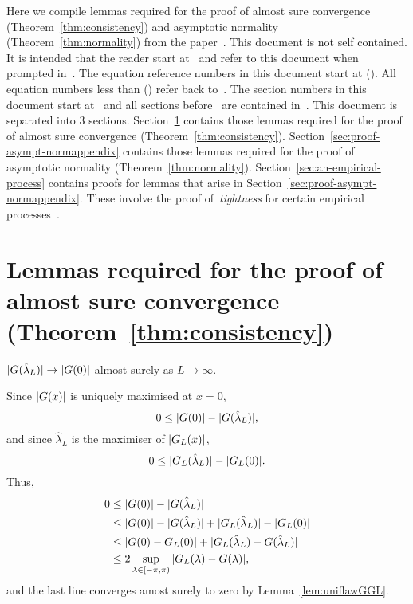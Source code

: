 \documentclass[journal]{IEEEtran}
\begin{document}
Here we compile lemmas required for the proof of almost sure convergence (Theorem~\ref{thm:consistency}) and asymptotic normality (Theorem~\ref{thm:normality}) from the paper~\cite{McKilliam_leastsqPSKpilotsdata_2012}.  This document is not self contained.  It is intended that the reader start at~\cite{McKilliam_leastsqPSKpilotsdata_2012} and refer to this document when prompted in~\cite{McKilliam_leastsqPSKpilotsdata_2012}.  The equation reference numbers in this document start at ().  All equation numbers less than () refer back to~\cite{McKilliam_leastsqPSKpilotsdata_2012}.  The section numbers in this document start at~ and all sections before~ are contained in~\cite{McKilliam_leastsqPSKpilotsdata_2012}.  This document is separated into 3 sections.  Section~\ref{sec:proof-almost-sureappendix} contains those lemmas required for the proof of almost sure convergence (Theorem~\ref{thm:consistency}).  Section~\ref{sec:proof-asympt-normappendix} contains those lemmas required for the proof of asymptotic normality (Theorem~\ref{thm:normality}).  Section~\ref{sec:an-empirical-process} contains proofs for lemmas that arise in Section~\ref{sec:proof-asympt-normappendix}.  These involve the proof of~\emph{tightness} for certain empirical processes~\cite{Billingsley1999_convergence_of_probability_measures,Dudley_unif_central_lim_th_1999,Shorak_emp_proc_stat_2009}. 

\section{Lemmas required for the proof of almost sure convergence (Theorem~\ref{thm:consistency}) } \label{sec:proof-almost-sureappendix}

\begin{lemma}\label{lem:convtoexpGlamL} 
${\vert G(\hat{\lambda}_L) \vert} \rightarrow {\vert G(0) \vert}$ almost surely as $L \rightarrow \infty$.
\end{lemma}
\begin{IEEEproof}
Since ${\vert G(x) \vert}$ is uniquely maximised at $x=0$,
\[
0 \leq {\vert G(0) \vert} - {\vert G(\hat{\lambda}_L) \vert},
\]
and since $\hat{\lambda}_L$ is the maximiser of ${\left\vert G_L(x) \right\vert}$,
\[ 
0 \leq {\vert G_L(\hat{\lambda}_L) \vert} - {\vert G_L(0) \vert}.
\]
Thus,
\begin{align*}
0 &\leq {\vert G(0) \vert} - {\vert G(\hat{\lambda}_L) \vert} \\ 
& \leq {\vert G(0) \vert} - {\vert G(\hat{\lambda}_L) \vert} + {\vert G_L(\hat{\lambda}_L) \vert} - {\vert G_L(0) \vert}\\
& \leq |G(0) - G_L(0)| + |G_L(\hat{\lambda}_L) - G(\hat{\lambda}_L)| \\
&\leq 2\sup_{\lambda \in [-\pi, \pi)} {\vert G_L(\lambda) - G(\lambda) \vert},
\end{align*}
and the last line converges amost surely to zero by Lemma~\ref{lem:uniflawGGL}.
\end{IEEEproof}
\end{document}
